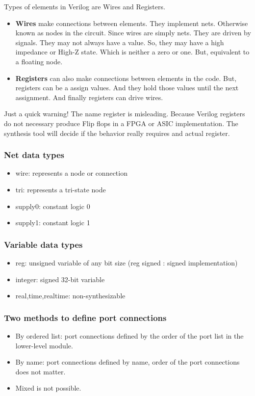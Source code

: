 Types of elements in Verilog are Wires and Registers.
\begin{itemize}
	\item \textbf{Wires} make connections between elements. They implement nets. Otherwise known as nodes in the circuit. Since wires are simply nets. They are driven by signals. They may not always have a value. So, they may have a high impedance or High-Z state. Which is neither a zero or one. But, equivalent to a floating node. 
	\item \textbf{Registers} can also make connections between elements in the code. But, registers can be a assign values. And they hold those values until the next assignment. And finally registers can drive wires. 
\end{itemize} 
	
Just a quick warning! The name register is misleading. Because Verilog registers do not necessary produce Flip flops in a FPGA or ASIC implementation. The synthesis tool will decide if the behavior really requires and actual register.


\subsubsection{Net data types}
\begin{itemize}
	\item wire: represents a node or connection
	\item tri: represents a tri-state node
	\item supply0: constant logic 0
	\item supply1: constant logic 1
\end{itemize} 

\subsubsection{Variable data types}
\begin{itemize}
	\item reg: unsigned variable of any bit size (reg signed : signed implementation)
	\item integer: signed 32-bit variable
	\item real,time,realtime: non-synthesizable
\end{itemize} 

\subsubsection{Two methods to define port connections}
\begin{itemize}
	\item By ordered list: port connections defined by the order of the port list in the lower-level module.
	\item By name: port connections defined by name, order of the port connections does not matter.
	\item Mixed is not possible.
\end{itemize} 

